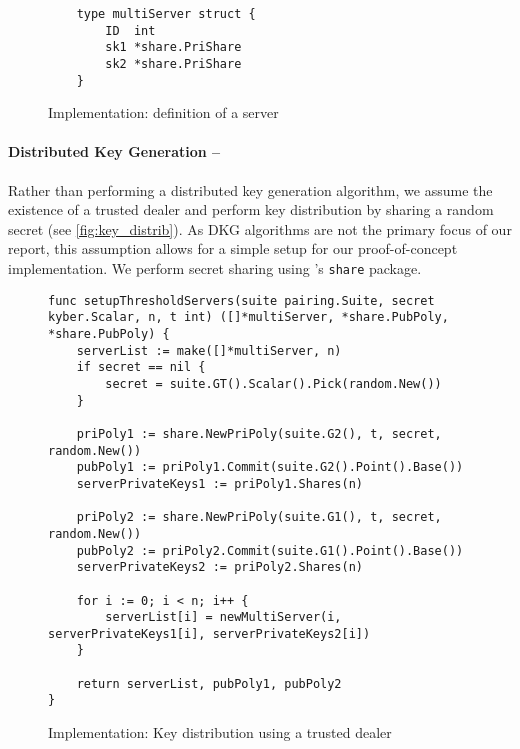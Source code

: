 	\begin{figure}[H]
		\begin{center}
			\begin{lstlisting}
	type multiServer struct {
		ID  int
		sk1 *share.PriShare
		sk2 *share.PriShare
	}
			\end{lstlisting}
			\caption{Implementation: definition of a server}
			\label{fig:server_def}
		\end{center}
  	\end{figure}
  	
  	\paragraph{Distributed Key Generation --} Rather than performing a distributed key generation algorithm, we assume the existence of a trusted dealer and perform key distribution by sharing a random secret (see \autoref{fig:key_distrib}). As DKG algorithms are not the primary focus of our report, this assumption allows for a simple setup for our proof-of-concept implementation. We perform secret sharing using \kyber's \texttt{share} package.
  	
  	\begin{figure}[H]
		\begin{center}
		\begin{lstlisting}
func setupThresholdServers(suite pairing.Suite, secret kyber.Scalar, n, t int) ([]*multiServer, *share.PubPoly, *share.PubPoly) {
	serverList := make([]*multiServer, n)
	if secret == nil {
		secret = suite.GT().Scalar().Pick(random.New())
	}

	priPoly1 := share.NewPriPoly(suite.G2(), t, secret, random.New())
	pubPoly1 := priPoly1.Commit(suite.G2().Point().Base())
	serverPrivateKeys1 := priPoly1.Shares(n)

	priPoly2 := share.NewPriPoly(suite.G1(), t, secret, random.New())
	pubPoly2 := priPoly2.Commit(suite.G1().Point().Base())
	serverPrivateKeys2 := priPoly2.Shares(n)

	for i := 0; i < n; i++ {
		serverList[i] = newMultiServer(i, serverPrivateKeys1[i], serverPrivateKeys2[i])
	}

	return serverList, pubPoly1, pubPoly2
}
		\end{lstlisting}
	\caption{Implementation: Key distribution using a trusted dealer}
		\label{fig:key_distrib}
		\end{center}
	\end{figure}

